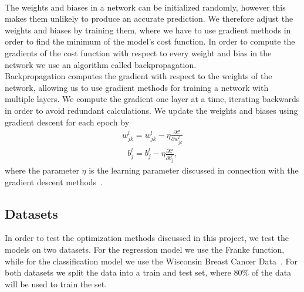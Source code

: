 \documentclass[english,notitlepage,reprint,nofootinbib]{revtex4-2}  %
\begin{document}
\vspace{3mm}
\\ 
The weights and biases in a network can be initialized randomly, however this makes them unlikely to produce an accurate prediction. We therefore adjust the weights and biases by training them, where we have to use gradient methods in order to find the minimum of the model's cost function. In order to compute the gradients of the cost function with respect to every weight and bias in the network we use an algorithm called backpropagation. 
\vspace{3mm}
\\ 
Backpropagation computes the gradient with respect to the weights of the network, allowing us to use gradient methods for training a network with multiple layers. We compute the gradient one layer at a time, iterating backwards in order to avoid redundant calculations. 
We update the weights and biases using gradient descent for each epoch by 
\begin{align}
    w_{jk}^l = w_{jk}^l - \eta\frac{\partial\mathcal{C}}{\partial w^l_{jk}}
\end{align}
\begin{align}
    b^l_j = b^l_j - \eta\frac{\partial\mathcal{C}}{\partial b^l_j}, 
\end{align}
where the parameter $\eta$ is the learning parameter discussed in connection with the gradient descent methods~\cite{lecture_notes}. 


 





\subsection*{Datasets} %
In order to test the optimization methods discussed in this project, we test the models on two datasets. For the regression model we use the Franke function, while for the classification model we use the Wisconsin Breast Cancer Data~\cite{BreastCancerData}. 
For both datasets we split the data into a train and test set, where $80\%$ of the data will be used to train the set. 
\end{document}

